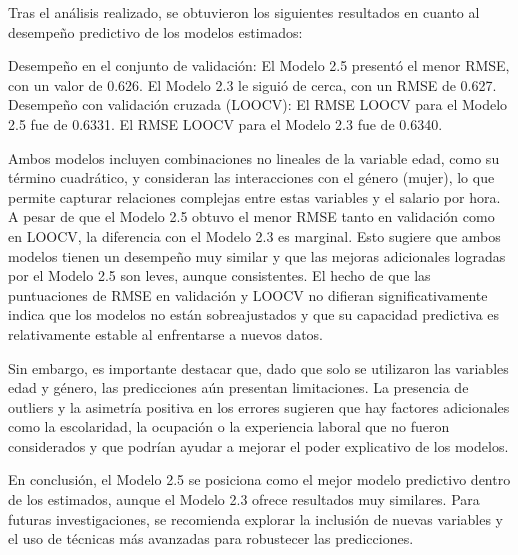 \documentclass[12pt,a4paper,onecolumn]{article}
\begin{document}
\begin{enumerate}
\begin{enumerate}
    Tras el an\'alisis realizado, se obtuvieron los siguientes resultados en cuanto al desempe\~no predictivo de los modelos estimados:
    
    Desempe\~no en el conjunto de validaci\'on:
    El Modelo 2.5 present\'o el menor RMSE, con un valor de 0.626.
    El Modelo 2.3 le sigui\'o de cerca, con un RMSE de 0.627.
    Desempe\~no con validaci\'on cruzada (LOOCV):
    El RMSE LOOCV para el Modelo 2.5 fue de 0.6331.
    El RMSE LOOCV para el Modelo 2.3 fue de 0.6340.
    
    Ambos modelos incluyen combinaciones no lineales de la variable edad, como su t\'ermino cuadr\'atico, y consideran las interacciones con el g\'enero (mujer), lo que permite capturar relaciones complejas entre estas variables y el salario por hora.
    A pesar de que el Modelo 2.5 obtuvo el menor RMSE tanto en validaci\'on como en LOOCV, la diferencia con el Modelo 2.3 es marginal. Esto sugiere que ambos modelos tienen un desempe\~no muy similar y que las mejoras adicionales logradas por el Modelo 2.5 son leves, aunque consistentes.
    El hecho de que las puntuaciones de RMSE en validaci\'on y LOOCV no difieran significativamente indica que los modelos no est\'an sobreajustados y que su capacidad predictiva es relativamente estable al enfrentarse a nuevos datos.
    
    Sin embargo, es importante destacar que, dado que solo se utilizaron las variables edad y g\'enero, las predicciones a\'un presentan limitaciones. La presencia de outliers y la asimetr\'ia positiva en los errores sugieren que hay factores adicionales como la escolaridad, la ocupaci\'on o la experiencia laboral que no fueron considerados y que podr\'ian ayudar a mejorar el poder explicativo de los modelos.
    
    En conclusi\'on, el Modelo 2.5 se posiciona como el mejor modelo predictivo dentro de los estimados, aunque el Modelo 2.3 ofrece resultados muy similares. Para futuras investigaciones, se recomienda explorar la inclusi\'on de nuevas variables y el uso de t\'ecnicas m\'as avanzadas para robustecer las predicciones.





    
\end{enumerate}

    
\end{enumerate}



\end{document}
